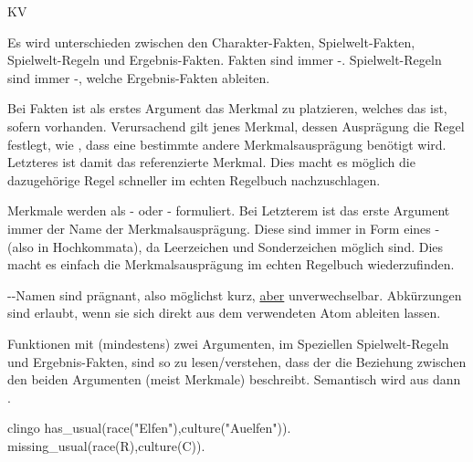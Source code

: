 \begin{enumerateWithCode}{KV}
    \item Es wird unterschieden zwischen den Charakter-Fakten, Spielwelt-Fakten, Spielwelt-Regeln  und Ergebnis-Fakten.
    Fakten sind immer -.
    Spielwelt-Regeln sind immer -, welche Ergebnis-Fakten ableiten.

    \item\label{itm:KV.Verursacher} Bei Fakten ist als erstes Argument das Merkmal zu platzieren, welches das  ist, sofern vorhanden.
    Verursachend gilt jenes Merkmal, dessen Ausprägung die Regel festlegt, wie \zB, dass eine bestimmte andere Merkmalsausprägung benötigt wird.
    Letzteres ist damit das referenzierte Merkmal.
    Dies macht es möglich die dazugehörige Regel schneller im echten Regelbuch nachzuschlagen.

    \item\label{itm:KV.Merkmale} Merkmale werden als - oder - formuliert.
    Bei Letzterem ist das erste Argument immer der Name der Merkmalsausprägung.
    Diese sind immer in Form eines - (also in Hochkommata), da Leerzeichen und Sonderzeichen möglich sind.
    Dies macht es einfach die Merkmalsausprägung im echten Regelbuch wiederzufinden.

    \item {}--Namen sind prägnant, also möglichst kurz, \underline{aber} unverwechselbar.
    Abkürzungen sind erlaubt, wenn sie sich direkt aus dem verwendeten Atom ableiten lassen.

    \item\label{itm:KV.Relation} Funktionen mit (mindestens) zwei Argumenten, im Speziellen Spielwelt-Regeln und Ergebnis-Fakten, sind so zu lesen/verstehen, dass der  die Beziehung zwischen den beiden Argumenten (meist Merkmale) beschreibt.
    Semantisch wird aus  dann .
    \begin{mintedNameless}{clingo}
has_usual(race("Elfen"),culture("Auelfen")). %
missing_usual(race(R),culture(C)). %
    \end{mintedNameless}


\end{enumerateWithCode}
